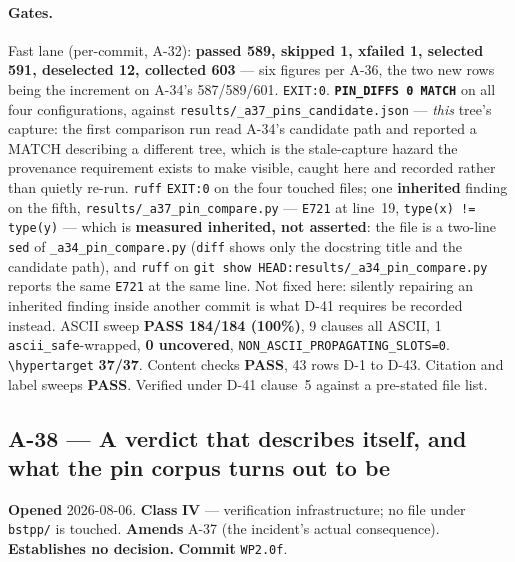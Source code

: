 \documentclass[
  10pt,
]{article}
\begin{document}
\paragraph{Gates.}
Fast lane (per-commit, A-32): \textbf{passed 589, skipped 1, xfailed 1, selected 591, deselected 12, collected 603} --- six figures per A-36, the two new rows being the increment on A-34's 587/589/601. \texttt{EXIT:0}. \textbf{\texttt{PIN\_DIFFS 0 MATCH}} on all four configurations, against \texttt{results/\allowbreak{}\_a37\_pins\_candidate.json} --- \emph{this} tree's capture: the first comparison run read A-34's candidate path and reported a MATCH describing a different tree, which is the stale-capture hazard the provenance requirement exists to make visible, caught here and recorded rather than quietly re-run. \texttt{ruff} \texttt{EXIT:0} on the four touched files; one \textbf{inherited} finding on the fifth, \texttt{results/\allowbreak{}\_a37\_pin\_compare.py} --- \texttt{E721} at line~19, \texttt{type(x) != type(y)} --- which is \textbf{measured inherited, not asserted}: the file is a two-line \texttt{sed} of \texttt{\_a34\_pin\_compare.py} (\texttt{diff} shows only the docstring title and the candidate path), and \texttt{ruff} on \texttt{git show HEAD:results/\allowbreak{}\_a34\_pin\_compare.py} reports the same \texttt{E721} at the same line. Not fixed here: silently repairing an inherited finding inside another commit is what D-41 requires be recorded instead. ASCII sweep \textbf{PASS 184/184 (100\%)}, 9 clauses all ASCII, 1 \texttt{ascii\_safe}-wrapped, \textbf{0 uncovered}, \texttt{NON\_ASCII\_PROPAGATING\_SLOTS=0}. \texttt{\textbackslash hypertarget} \textbf{37/37}. Content checks \textbf{PASS}, 43 rows D-1 to D-43. Citation and label sweeps \textbf{PASS}. Verified under D-41 clause~5 against a pre-stated file list.

\hypertarget{a-38}{%
\subsection{A-38 --- A verdict that describes itself, and what the pin corpus turns out to be}\label{a-38}}

\textbf{Opened} 2026-08-06. \textbf{Class} \textbf{IV} --- verification infrastructure; no file under \texttt{bstpp/} is touched. \textbf{Amends} A-37 (the incident's actual consequence). \textbf{Establishes no decision.} \textbf{Commit} \texttt{WP2.0f}.
\end{document}

